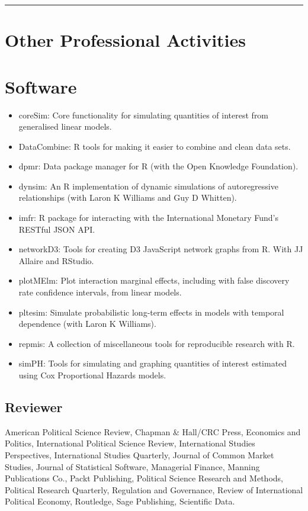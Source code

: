 \documentclass[a4paper]{article}
\begin{document}
\vspace{0.25cm}
\medskip\hrule height 1pt
\vspace{0.5cm}

\section*{Other Professional Activities}

\section*{Software}

\begin{itemize}
    \item coreSim: Core functionality for simulating quantities of interest from generalised linear models.
    \item DataCombine: R tools for making it easier to combine and clean data sets.
    \item dpmr: Data package manager for R (with the Open Knowledge Foundation).
    \item dynsim: An R implementation of dynamic simulations of autoregressive relationships (with Laron K Williams and Guy D Whitten).
    \item imfr: R package for interacting with the International Monetary Fund's RESTful JSON API.
    \item networkD3: Tools for creating D3 JavaScript network graphs from R. With JJ Allaire and RStudio.
    \item plotMElm: Plot interaction marginal effects, including with false discovery rate confidence intervals, from linear models.
    \item pltesim: Simulate probabilistic long-term effects in models with temporal dependence (with Laron K Williams).
    \item repmis: A collection of miscellaneous tools for reproducible research with R.
    \item simPH: Tools for simulating and graphing quantities of interest estimated using Cox Proportional Hazards models.
\end{itemize}

\subsection*{Reviewer}

American Political Science Review, Chapman \& Hall/CRC Press, Economics and Politics,
International Political Science Review, International Studies Perspectives,
International Studies Quarterly,
Journal of Common Market Studies, Journal of Statistical Software,
Managerial Finance, Manning Publications Co.,
Packt Publishing, Political Science Research and Methods, Political Research
Quarterly, Regulation and Governance, Review of International Political Economy,
Routledge, Sage Publishing, Scientific Data.
\end{document}
